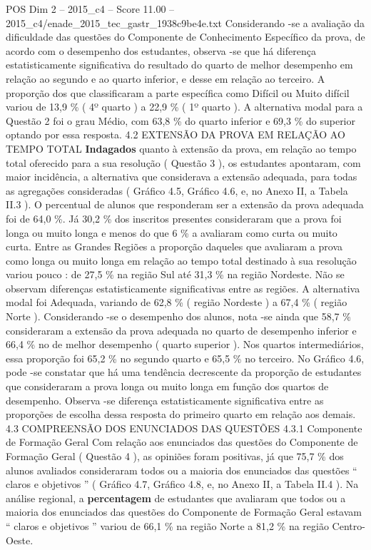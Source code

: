 \begin{textsample}{POS Dim 2 – 2015\_c4 – Score 11.00 – 2015\_c4/enade\_2015\_tec\_gastr\_1938c9be4e.txt}
Considerando -se a avaliação da dificuldade das questões do Componente de Conhecimento Específico da prova, de acordo com o desempenho dos estudantes, observa -se que há diferença estatisticamente significativa do resultado do quarto de melhor desempenho em relação ao segundo e ao quarto inferior, e desse em relação ao terceiro.
A proporção dos que classificaram a parte específica como Difícil ou Muito difícil variou de 13,9 \% ( 4º quarto ) a 22,9 \% ( 1º quarto ).
A alternativa modal para a Questão 2 foi o grau Médio, com 63,8 \% do quarto inferior e 69,3 \% do superior optando por essa resposta. 4.2 EXTENSÃO DA PROVA EM RELAÇÃO AO TEMPO TOTAL \textbf{Indagados} quanto à extensão da prova, em relação ao tempo total oferecido para a sua resolução ( Questão 3 ), os estudantes apontaram, com maior incidência, a alternativa que considerava a extensão adequada, para todas as agregações consideradas ( Gráfico 4.5, Gráfico 4.6, e, no Anexo II, a Tabela II.3 ).
O percentual de alunos que responderam ser a extensão da prova adequada foi de 64,0 \%.
Já 30,2 \% dos inscritos presentes consideraram que a prova foi longa ou muito longa e menos do que 6 \% a avaliaram como curta ou muito curta.
Entre as Grandes Regiões a proporção daqueles que avaliaram a prova como longa ou muito longa em relação ao tempo total destinado à sua resolução variou pouco : de 27,5 \% na região Sul até 31,3 \% na região Nordeste.
Não se observam diferenças estatisticamente significativas entre as regiões.
A alternativa modal foi Adequada, variando de 62,8 \% ( região Nordeste ) a 67,4 \% ( região Norte ).
Considerando -se o desempenho dos alunos, nota -se ainda que 58,7 \% consideraram a extensão da prova adequada no quarto de desempenho inferior e 66,4 \% no de melhor desempenho ( quarto superior ).
Nos quartos intermediários, essa proporção foi 65,2 \% no segundo quarto e 65,5 \% no terceiro.
No Gráfico 4.6, pode -se constatar que há uma tendência decrescente da proporção de estudantes que consideraram a prova longa ou muito longa em função dos quartos de desempenho.
Observa -se diferença estatisticamente significativa entre as proporções de escolha dessa resposta do primeiro quarto em relação aos demais. 4.3 COMPREENSÃO DOS ENUNCIADOS DAS QUESTÕES 4.3.1 Componente de Formação Geral Com relação aos enunciados das questões do Componente de Formação Geral ( Questão 4 ), as opiniões foram positivas, já que 75,7 \% dos alunos avaliados consideraram todos ou a maioria dos enunciados das questões “ claros e objetivos ” ( Gráfico 4.7, Gráfico 4.8, e, no Anexo II, a Tabela II.4 ).
Na análise regional, a \textbf{percentagem} de estudantes que avaliaram que todos ou a maioria dos enunciados das questões do Componente de Formação Geral estavam “ claros e objetivos ” variou de 66,1 \% na região Norte a 81,2 \% na região Centro-Oeste.

\end{textsample}
